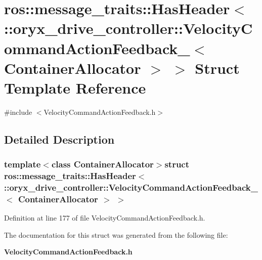 \section{ros\-:\-:message\-\_\-traits\-:\-:\-Has\-Header$<$ \-:\-:oryx\-\_\-drive\-\_\-controller\-:\-:\-Velocity\-Command\-Action\-Feedback\-\_\-$<$ \-Container\-Allocator $>$ $>$ \-Struct \-Template \-Reference}
\label{structros_1_1message__traits_1_1HasHeader_3_01_1_1oryx__drive__controller_1_1VelocityCommandActi27f5e80d558a62d7d809dccd52966e11}


{\ttfamily \#include $<$\-Velocity\-Command\-Action\-Feedback.\-h$>$}



\subsection{\-Detailed \-Description}
\subsubsection*{template$<$class Container\-Allocator$>$struct ros\-::message\-\_\-traits\-::\-Has\-Header$<$ \-::oryx\-\_\-drive\-\_\-controller\-::\-Velocity\-Command\-Action\-Feedback\-\_\-$<$ Container\-Allocator $>$ $>$}



\-Definition at line 177 of file \-Velocity\-Command\-Action\-Feedback.\-h.



\-The documentation for this struct was generated from the following file\-:\begin{DoxyCompactItemize}
\item 
{\bf \-Velocity\-Command\-Action\-Feedback.\-h}\end{DoxyCompactItemize}
